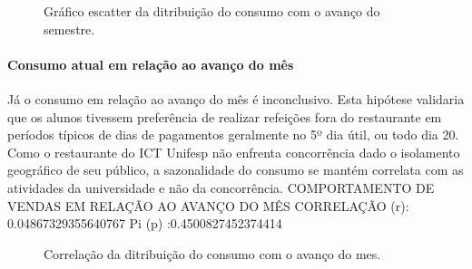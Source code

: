 \documentclass[	12pt, Times, openright, twoside, a4paper, english, brazil]{abntex2}
\begin{document}
                \begin{figure}[!ht]
                	\caption{Gráfico escatter da ditribuição do consumo com o avanço do semestre. \label{fig:case1_perc_sem_scatter} }
                \end{figure}
              \paragraph{Consumo atual em relação ao avanço do mês}
                Já o consumo em relação ao avanço do mês é inconclusivo. Esta hipótese validaria que os alunos tivessem preferência de realizar refeições fora do restaurante em períodos típicos de dias de pagamentos geralmente no 5º dia útil, ou todo dia 20. Como o restaurante do ICT Unifesp não enfrenta concorrência dado o isolamento geográfico de seu público, a sazonalidade do consumo se mantém correlata com as atividades da universidade e não da concorrência.\newline
                COMPORTAMENTO DE VENDAS EM RELAÇÃO AO AVANÇO DO MÊS\newline
                CORRELAÇÃO (r): 0.04867329355640767\newline
                Pi (p) :0.4500827452374414\newline
                \begin{figure}[!ht]
                    	\caption{Correlação da ditribuição do consumo com o avanço do mes. \label{fig:case1_perc_mes} }
                    \end{figure}
                
\end{document}
